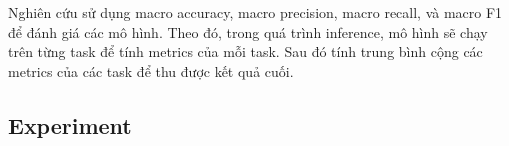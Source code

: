 \documentclass[aps,prb,groupedaddress,twocolumn,showpacs,dvipdfmx,superscriptaddress,pdftex]{revtex4-2}
\begin{document}

\vspace{2mm}

Nghiên cứu sử dụng macro accuracy, macro precision, macro recall, và macro F1 để đánh giá các mô hình. Theo đó, trong quá trình inference, mô hình sẽ chạy trên từng task để tính metrics của mỗi task. Sau đó tính trung bình cộng các metrics của các task để thu được kết quả cuối.


\vspace{2mm}
\subsection{Experiment}

\end{document}
